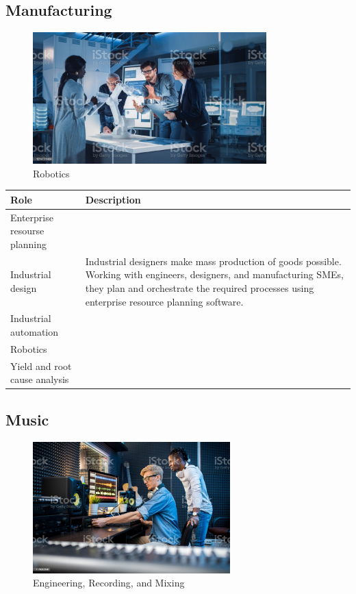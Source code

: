 \subsection{Manufacturing}

\begin{figure}[H]
	\begin{center}
		\caption{Robotics}
		\vskip 4pt
		\includegraphics[height=2in]{images/careers/istockphoto-1214111404-1024x1024.jpg}
	\end{center}
\end{figure}

\begin{table}[H]
	\begin{center}
		\begin{tabular}{p{1in}|p{3.4in}} 
			\textbf{Role} & \textbf{Description}\\
			\hline
			Enterprise resourse planning & \\
			\hline
			Industrial design & Industrial designers make mass production of goods possible. Working with engineers, designers, and manufacturing SMEs, they plan and orchestrate the required processes using enterprise resource planning software.\\
			\hline
			Industrial automation & \\
			\hline
			Robotics & \\
			\hline
			Yield and root cause analysis & \\
			\hline
		\end{tabular}
	\end{center}
\end{table}

\subsection{Music}

\begin{figure}[H]
	\begin{center}
		\caption{Engineering, Recording, and Mixing}
		\vskip 4pt
		\includegraphics[height=2in]{images/careers/istockphoto-1176082646-1024x1024.jpg}
	\end{center}
\end{figure}

